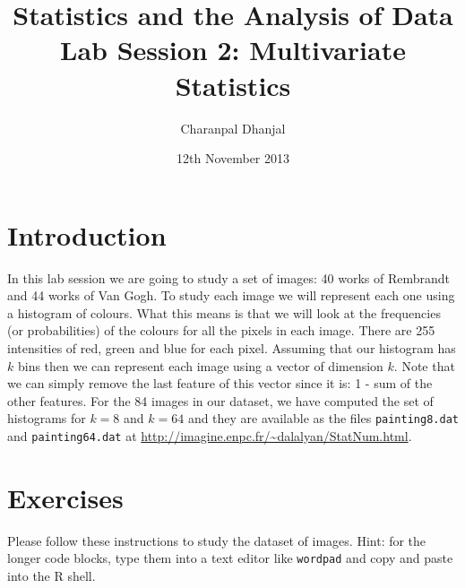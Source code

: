 \documentclass[a4paper,10pt]{article}
\title{Statistics and the Analysis of Data\\ Lab Session 2: Multivariate Statistics}
\author{Charanpal Dhanjal}
\begin{document}
\date{12th November 2013}
\maketitle

\section{Introduction} 

In this lab session we are going to study a set of images: 40 works of Rembrandt and 44 works of Van Gogh. To study each image we will represent each one using a histogram of colours. What this means is that we will look at the frequencies (or probabilities) of the colours for all the pixels in each image. There are 255 intensities of red, green and blue for each pixel. Assuming that our histogram has $k$ bins then we can represent each image using a vector of dimension $k$. Note that we can simply remove the last feature of this vector since it is:  1 - sum of the other features. For the 84 images in our dataset, we have computed the set of histograms for $k=8$ and $k=64$ and they are available as the files \texttt{painting8.dat} and \texttt{painting64.dat} at \url{http://imagine.enpc.fr/~dalalyan/StatNum.html}. 

\section{Exercises} 

Please follow these instructions to study the dataset of images. Hint: for the longer code blocks, type them into a text editor like \texttt{wordpad} and copy and paste into the R shell.  
\end{document}
